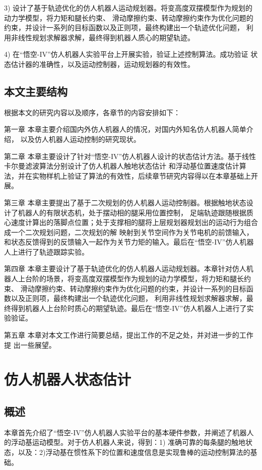 3) 设计了基于轨迹优化的仿人机器人运动规划器。将变高度双摆模型作为规划的动力学模型，将力矩和腿长约束、
滑动摩擦约束、转动摩擦约束作为优化问题的约束，并设计一系列的目标函数以及正则项，最终构建出一个轨迹优化问题，
利用非线性规划求解器求解，最终得到机器人质心的期望轨迹。

4) 在“悟空-IV”仿人机器人实验平台上开展实验，验证上述控制算法。成功验证
状态估计器的准确性，以及运动控制器，运动规划器的有效性。

\section{本文主要结构}
根据本文的研究内容以及顺序，各章节的内容安排如下：

第一章 本章主要介绍国内外仿人机器人的情况，对国内外知名仿人机器人简单介绍，
以及仿人机器人运动控制的研究现状。

第二章 本章主要设计了针对“悟空-IV”仿人机器人设计的状态估计方法。基于线性卡尔曼滤波算法分别设计了仿人机器人触地状态估计
和浮动基位置速度估计算法，并在实物样机上验证了算法的有效性，后续章节研究内容得以在本章基础上开展。

第三章 本章主要提出了基于二次规划的仿人机器人运动控制器。根据触地状态设计了机器人的有限状态机，处于摆动相的腿采用位置控制，
足端轨迹跟随根据质心速度计算出的落脚点位置；处于支撑相的腿将上层规划器规划出的运动行为组合成一个二次规划问题，二次规划的解
映射到关节空间作为关节电机的前馈输入，和状态反馈得到的反馈输入一起作为关节力矩的输入。最后在“悟空-IV”仿人机器人上进行了轨迹跟踪实验。

第四章 本章主要设计了基于轨迹优化的仿人机器人运动规划器。本章针对仿人机器人上台阶的场景，将变高度双摆模型作为规划的动力学模型，将力矩和腿长约束、
滑动摩擦约束、转动摩擦约束作为优化问题的约束，并设计一系列的目标函数以及正则项，最终构建出一个轨迹优化问题，
利用非线性规划求解器求解，最终得到机器人上台阶时质心的期望轨迹。最后在“悟空-IV”仿人机器人上进行了实验验证。

第五章 本章对本文工作进行简要总结，提出工作的不足之处，并对进一步的工作提
出一些展望。
\chapter{仿人机器人状态估计}

\section{概述}

本章首先介绍了“悟空-IV”仿人机器人实验平台的基本硬件参数，并阐述了机器人的浮动基运动模型。对于仿人机器人来说，得到：1) 准确可靠的每条腿的触地状态，以及：2)浮动基在惯性系下的位置和速度信息是实现鲁棒的运动控制算法的基础。

